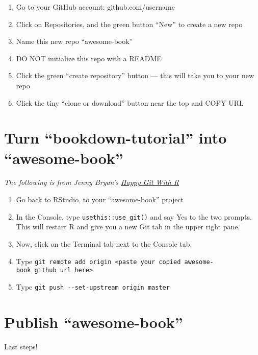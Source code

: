 \documentclass[
]{book}
\providecommand{\tightlist}{%
  \setlength{\itemsep}{0pt}\setlength{\parskip}{0pt}}
\begin{document}
\begin{enumerate}
\def\labelenumi{\arabic{enumi}.}
\tightlist
\item
  Go to your GitHub account: github.com/username
\item
  Click on Repositories, and the green button ``New'' to create a new repo
\item
  Name this new repo ``awesome-book''
\item
  DO NOT initialize this repo with a README
\item
  Click the green ``create repository'' button --- this will take you to your new repo
\item
  Click the tiny ``clone or download'' button near the top and COPY URL
\end{enumerate}

\hypertarget{turn-bookdown-tutorial-into-awesome-book}{%
\section{Turn ``bookdown-tutorial'' into ``awesome-book''}\label{turn-bookdown-tutorial-into-awesome-book}}

\emph{The following is from Jenny Bryan's \href{https://happygitwithr.com/existing-github-last.html}{Happy Git With R}}

\begin{enumerate}
\def\labelenumi{\arabic{enumi}.}
\tightlist
\item
  Go back to RStudio, to your ``awesome-book'' project
\item
  In the Console, type \texttt{usethis::use\_git()} and say Yes to the two prompts. This will restart R and give you a new Git tab in the upper right pane.
\item
  Now, click on the Terminal tab next to the Console tab.
\item
  Type \texttt{git\ remote\ add\ origin\ \textless{}paste\ your\ copied\ awesome-book\ github\ url\ here\textgreater{}}
\item
  Type \texttt{git\ push\ -\/-set-upstream\ origin\ master}
\end{enumerate}

\hypertarget{publish-awesome-book}{%
\section{Publish ``awesome-book''}\label{publish-awesome-book}}

Last steps!
\end{document}
